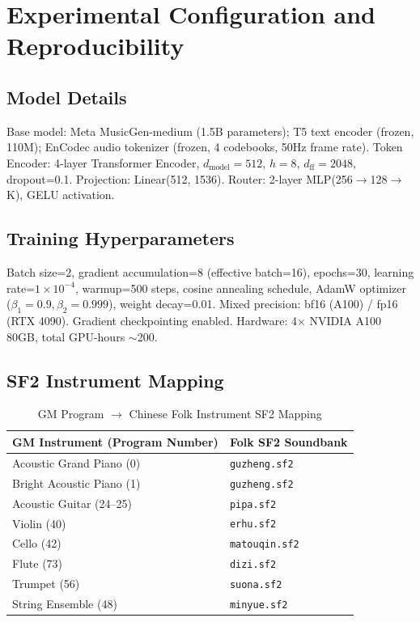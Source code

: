 \documentclass[conference]{IEEEtran}
\begin{document}
\appendices

\section{Experimental Configuration and Reproducibility}

\subsection{Model Details}
Base model: Meta MusicGen-medium (1.5B parameters); T5 text encoder (frozen, 110M); EnCodec audio tokenizer (frozen, 4 codebooks, 50Hz frame rate). Token Encoder: 4-layer Transformer Encoder, $d_{\text{model}}=512$, $h=8$, $d_{\text{ff}}=2048$, dropout=0.1. Projection: Linear(512, 1536). Router: 2-layer MLP(256$\rightarrow$128$\rightarrow$K), GELU activation.

\subsection{Training Hyperparameters}
Batch size=2, gradient accumulation=8 (effective batch=16), epochs=30, learning rate=$1\times10^{-4}$, warmup=500 steps, cosine annealing schedule, AdamW optimizer ($\beta_1=0.9,\beta_2=0.999$), weight decay=0.01. Mixed precision: bf16 (A100) / fp16 (RTX 4090). Gradient checkpointing enabled. Hardware: 4$\times$ NVIDIA A100 80GB, total GPU-hours $\sim$200.

\subsection{SF2 Instrument Mapping}
\begin{table}[t]
\centering
\caption{GM Program $\rightarrow$ Chinese Folk Instrument SF2 Mapping}
\label{tab:sf2_mapping}
\begin{tabularx}{\columnwidth}{@{}Xl@{}}
\toprule
\textbf{GM Instrument (Program Number)} & \textbf{Folk SF2 Soundbank} \\
\midrule
Acoustic Grand Piano (0) & \texttt{guzheng.sf2} \\
Bright Acoustic Piano (1) & \texttt{guzheng.sf2} \\
Acoustic Guitar (24--25) & \texttt{pipa.sf2} \\
Violin (40) & \texttt{erhu.sf2} \\
Cello (42) & \texttt{matouqin.sf2} \\
Flute (73) & \texttt{dizi.sf2} \\
Trumpet (56) & \texttt{suona.sf2} \\
String Ensemble (48) & \texttt{minyue.sf2} \\
\bottomrule
\end{tabularx}
\end{table}
\end{document}
